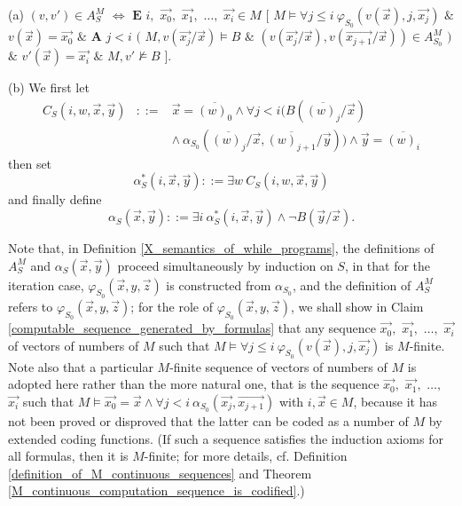 \documentclass[a4paper,11pt]{article}
\begin{document}
\begin{X_semantics_of_while_programs}
(a) $(v,v')\in A_S^M$ $\Leftrightarrow$ $\textbf{E}$ $i,$ $\vec{x_0},$ $\vec{x_1},$ $\ldots,$ $\vec{x_i}\in M$ $[$ $M\models \forall j\leq i\ \varphi_{S_0}(v(\vec{x}),j,\vec{x_j})$ $\&$ $v(\vec{x}) = \vec{x_0}$ $\&$ $\textbf{A}$ $j< i$ $($ $M,v(\vec{x_j}/\vec{x})\models B$ $\&$ $(v(\vec{x_j}/\vec{x}), v(\vec{x_{j+1}}/\vec{x}) ) \in A_{S_0}^M$ $)$ $\&$ $v'(\vec{x}) = \vec{x_i}$ $\&$ $M,v'\not\models B$ $]$.

(b) We first let
\begin{eqnarray*}
  C_S(i,w,\vec{x},\vec{y}) &::=& \vec{x}=\overline{(w)_0} \wedge \forall j<i (B(\overline{(w)_j}/\vec{x}) \\
                         &&       \wedge\: \alpha_{S_0}(\overline{(w)_j}/\vec{x},\overline{(w)_{j+1}}/\vec{y})) \wedge \vec{y} = \overline{(w)_i}
\end{eqnarray*}
then set
\begin{equation*}
\alpha_S^*(i,\vec{x},\vec{y}) ::= \exists w\ C_S(i,w,\vec{x},\vec{y})
\end{equation*}
and finally define
\begin{equation*}
\alpha_S(\vec{x},\vec{y}) ::= \exists i\ \alpha_S^*(i,\vec{x},\vec{y}) \wedge \neg B(\vec{y}/\vec{x}).
\end{equation*}
\end{X_semantics_of_while_programs}

Note that, in Definition \ref{X_semantics_of_while_programs}, the definitions of $A_S^M$ and $\alpha_S(\vec{x},\vec{y})$ proceed simultaneously by induction on $S$, in that for the iteration case, $\varphi_{S_0}(\vec{x},y,\vec{z})$ is constructed from $\alpha_{S_0}$, and the definition of $A_S^M$ refers to $\varphi_{S_0}(\vec{x},y,\vec{z})$; for the role of $\varphi_{S_0}(\vec{x},y,\vec{z})$, we shall show in Claim \ref{computable_sequence_generated_by_formulas} that any sequence $\vec{x_0},$ $\vec{x_1},$ $\ldots,$ $\vec{x_i}$ of vectors of numbers of $M$ such that $M\models \forall j\leq i\ \varphi_{S_0}(v(\vec{x}),j,\vec{x_j})$ is $M$-finite. Note also that a particular $M$-finite sequence of vectors of numbers of $M$ is adopted here rather than the more natural one, that is the sequence $\vec{x_0},$ $\vec{x_1},$ $\ldots,$ $\vec{x_i}$ such that $M \models \vec{x_0} = \vec{x} \wedge \forall j<i ~ \alpha_{S_0}(\vec{x_j},\vec{x_{j+1}})$ with $i,\vec{x}\in M$, because it has not been proved or disproved that the latter can be coded as a number of $M$ by extended coding functions. (If such a sequence satisfies the induction axioms for all formulas, then it is $M$-finite; for more details, cf. Definition \ref{definition_of_M_continuous_sequences} and Theorem \ref{M_continuous_computation_sequence_is_codified}.)
\end{document}
